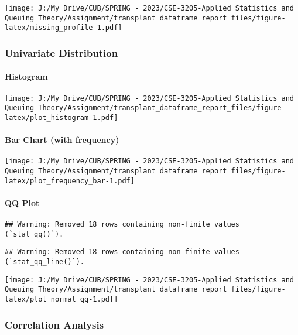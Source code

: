 \documentclass[
]{article}
\begin{document}
\texttt{[image: J:/My Drive/CUB/SPRING - 2023/CSE-3205-Applied Statistics and Queuing Theory/Assignment/transplant\_dataframe\_report\_files/figure-latex/missing\_profile-1.pdf]}

\hypertarget{univariate-distribution}{%
\subsubsection{Univariate Distribution}\label{univariate-distribution}}

\hypertarget{histogram}{%
\paragraph{Histogram}\label{histogram}}

\texttt{[image: J:/My Drive/CUB/SPRING - 2023/CSE-3205-Applied Statistics and Queuing Theory/Assignment/transplant\_dataframe\_report\_files/figure-latex/plot\_histogram-1.pdf]}

\hypertarget{bar-chart-with-frequency}{%
\paragraph{Bar Chart (with frequency)}\label{bar-chart-with-frequency}}

\texttt{[image: J:/My Drive/CUB/SPRING - 2023/CSE-3205-Applied Statistics and Queuing Theory/Assignment/transplant\_dataframe\_report\_files/figure-latex/plot\_frequency\_bar-1.pdf]}

\hypertarget{qq-plot}{%
\paragraph{QQ Plot}\label{qq-plot}}

\begin{verbatim}
## Warning: Removed 18 rows containing non-finite values (`stat_qq()`).
\end{verbatim}

\begin{verbatim}
## Warning: Removed 18 rows containing non-finite values (`stat_qq_line()`).
\end{verbatim}

\texttt{[image: J:/My Drive/CUB/SPRING - 2023/CSE-3205-Applied Statistics and Queuing Theory/Assignment/transplant\_dataframe\_report\_files/figure-latex/plot\_normal\_qq-1.pdf]}

\hypertarget{correlation-analysis}{%
\subsubsection{Correlation Analysis}\label{correlation-analysis}}
\end{document}
